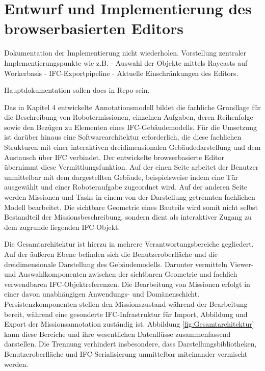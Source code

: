 \section{Entwurf und Implementierung des browserbasierten Editors}\label{sec:Editor}

Dokumentation der Implementierung nicht wiederholen. Vorstellung zentraler Implementierungspunkte wie z.B.  \newline
- Auswahl der Objekte mittels Raycasts auf Workerbasis \newline
- IFC-Exportpipeline \newline
- Aktuelle Einschränkungen des Editors. \newline

Hauptdokumentation sollen docs in Repo sein. \newline

Das in Kapitel 4 entwickelte Annotationsmodell bildet die fachliche Grundlage für die Beschreibung
von Robotermissionen, einzelnen Aufgaben, deren Reihenfolge sowie den Bezügen zu Elementen eines
IFC-Gebäudemodells. Für die Umsetzung ist darüber hinaus eine Softwarearchitektur
erforderlich, die diese fachlichen Strukturen mit einer interaktiven dreidimensionalen
Gebäudedarstellung und dem Austausch über IFC verbindet. Der entwickelte browserbasierte Editor
übernimmt diese Vermittlungsfunktion. Auf der einen Seite arbeitet der Benutzer unmittelbar mit dem
dargestellten Gebäude, beispielsweise indem eine Tür ausgewählt und einer Roboteraufgabe zugeordnet
wird. Auf der anderen Seite werden Missionen und Tasks in einem von der Darstellung getrennten
fachlichen Modell bearbeitet. Die sichtbare Geometrie eines Bauteils wird somit nicht selbst
Bestandteil der Missionsbeschreibung, sondern dient als interaktiver Zugang zu dem zugrunde
liegenden IFC-Objekt.

Die Gesamtarchitektur ist hierzu in mehrere Verantwortungsbereiche gegliedert. Auf der äußeren Ebene
befinden sich die Benutzeroberfläche und die dreidimensionale Darstellung des Gebäudemodells.
Darunter vermitteln Viewer- und Auswahlkomponenten zwischen der sichtbaren Geometrie und fachlich
verwendbaren IFC-Objektreferenzen. Die Bearbeitung von Missionen erfolgt in einer davon unabhängigen
Anwendungs- und Domänenschicht. Persistenzkomponenten stellen den Missionszustand während der
Bearbeitung bereit, während eine gesonderte IFC-Infrastruktur für Import, Abbildung und Export der
Missionsannotation zuständig ist. Abbildung \ref{fig:Gesamtarchitektur} kann diese Bereiche und ihre 
wesentlichen Datenflüsse zusammenfassend darstellen. Die Trennung verhindert insbesondere, dass
Darstellungsbibliotheken, Benutzeroberfläche und IFC-Serialisierung unmittelbar miteinander
vermischt werden.

